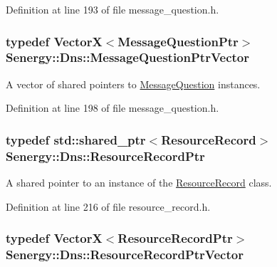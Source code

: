 Definition at line 193 of file message\-\_\-question.\-h.

\hypertarget{namespace_senergy_1_1_dns_a6983ff2422cfa510ca61831ae5cf1ffc}{
\subsubsection[{Message\-Question\-Ptr\-Vector}]{\setlength{\rightskip}{0pt plus 5cm}typedef {\bf Vector\-X}$<${\bf Message\-Question\-Ptr}$>$ {\bf Senergy\-::\-Dns\-::\-Message\-Question\-Ptr\-Vector}}}\label{namespace_senergy_1_1_dns_a6983ff2422cfa510ca61831ae5cf1ffc}


A vector of shared pointers to \hyperlink{class_senergy_1_1_dns_1_1_message_question}{Message\-Question} instances. 



Definition at line 198 of file message\-\_\-question.\-h.

\hypertarget{namespace_senergy_1_1_dns_a1fa04259a07ce7a270e09288aa456ffd}{
\subsubsection[{Resource\-Record\-Ptr}]{\setlength{\rightskip}{0pt plus 5cm}typedef std\-::shared\-\_\-ptr$<${\bf Resource\-Record}$>$ {\bf Senergy\-::\-Dns\-::\-Resource\-Record\-Ptr}}}\label{namespace_senergy_1_1_dns_a1fa04259a07ce7a270e09288aa456ffd}


A shared pointer to an instance of the \hyperlink{class_senergy_1_1_dns_1_1_resource_record}{Resource\-Record} class. 



Definition at line 216 of file resource\-\_\-record.\-h.

\hypertarget{namespace_senergy_1_1_dns_ad5ef448b2b508ce86c6ed91dccc10d3e}{
\subsubsection[{Resource\-Record\-Ptr\-Vector}]{\setlength{\rightskip}{0pt plus 5cm}typedef {\bf Vector\-X}$<${\bf Resource\-Record\-Ptr}$>$ {\bf Senergy\-::\-Dns\-::\-Resource\-Record\-Ptr\-Vector}}}\label{namespace_senergy_1_1_dns_ad5ef448b2b508ce86c6ed91dccc10d3e}


